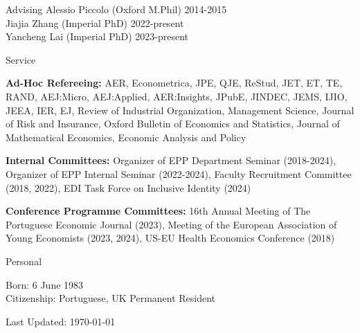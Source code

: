 \documentclass{resume}
\begin{document}
\begin{rSection}{Advising}
	Alessio Piccolo (Oxford M.Phil) \hfill {2014-2015} \\
	Jiajia Zhang (Imperial PhD) \hfill {2022-present} \\
	Yancheng Lai (Imperial PhD) \hfill {2023-present} \\
			
\end{rSection}




\begin{rSection}{Service}

\textbf{Ad-Hoc Refereeing:} AER, Econometrica, JPE, QJE, ReStud, 
JET, ET, TE, RAND, AEJ:Micro, AEJ:Applied, AER:Insights, 
JPubE, JINDEC, JEMS, IJIO, JEEA, IER, EJ, 
Review of Industrial Organization, Management Science, 
Journal of Risk and Insurance, Oxford Bulletin of Economics and Statistics, 
Journal of Mathematical Economics, Economic Analysis and Policy


\textbf{Internal Committees:} Organizer of EPP Department Seminar (2018-2024), 
Organizer of EPP Internal Seminar  (2022-2024), 
Faculty Recruitment Committee (2018, 2022), 
EDI Task Force on Inclusive Identity (2024)

\textbf{Conference Programme Committees:} 16th Annual Meeting of The Portuguese Economic Journal (2023), 
Meeting of the European Association of Young Economists (2023, 2024), 
US-EU Health Economics Conference (2018)
	
\end{rSection}




\begin{rSection}{Personal}

Born: 6 June 1983
\\ Citizenship: Portuguese, UK Permanent Resident

\end{rSection}


\vspace{1em}
\begin{center}
\scriptsize{Last Updated: \today}	
\end{center}
\end{document}
